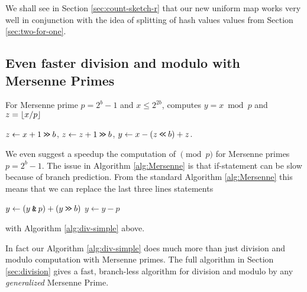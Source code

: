 We shall see in Section \ref{sec:count-sketch-r} that our new uniform map
works very well in conjunction with the idea of splitting of hash values 
values from Section \ref{sec:two-for-one}.




\subsection{Even faster division and modulo with Mersenne Primes}
%
\begin{algorithm}\label{alg:div-simple}
   \caption{For Mersenne prime $p=2^b-1$ and $x\leq 2^{2b}$, computes
   $y=x\bmod p$ and $z=\lfloor {x/p} \rfloor$}
   \begin{algorithmic}
      \State $z \gets x+1 \mathbin{\texttt{>\!>}} b$,
      \State $z \gets z+1 \mathbin{\texttt{>\!>}} b$,
      \State $y \gets x - (z \mathbin{\texttt{<\!<}} b) + z$.
   \end{algorithmic}
\end{algorithm}
%
We even suggest a speedup the computation of $\pmod p$ for Mersenne primes
$p=2^b-1$. The issue in Algorithm \ref{alg:Mersenne} is that
if-statement can be slow because of branch prediction.
From the standard Algorithm \ref{alg:Mersenne} this means that we can
replace the last three lines statements
\begin{algorithmic}
   \State $y \gets (y\mathbin{\texttt{\&}} p)+(y\mathbin{\texttt{>\!>}} b)$
      \State $y\gets y-p$
   \EndIf
\end{algorithmic}
with Algorithm \ref{alg:div-simple} above.

\vspace{1em}

In fact our Algorithm \ref{alg:div-simple} does much more than just division and modulo computation with Mersenne primes.
The full algorithm in Section \ref{sec:division} gives a fast, branch-less algorithm for division and modulo by any \emph{generalized} Mersenne Prime.


